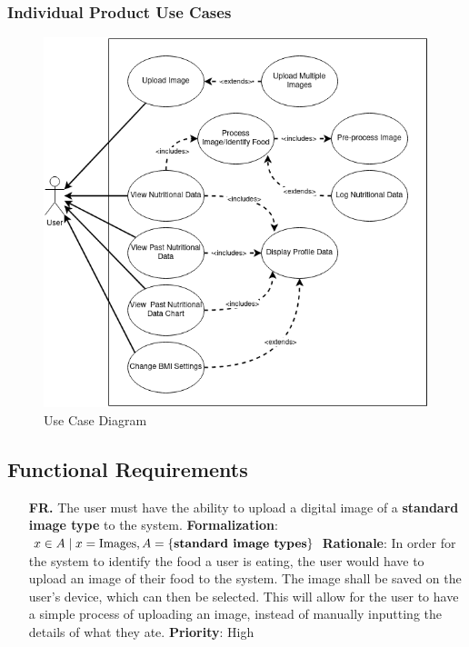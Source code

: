\documentclass[12pt]{article}
\newcounter{FRCounter}
\newcommand{\FillFRNumber}{\textbf{FR\arabic{FRCounter}.} \stepcounter{FRCounter}}
\begin{document}
\subsubsection{Individual Product Use Cases}
\begin{figure}[H]
	\centering
	\includegraphics[scale=0.7]{use_case_diagram.png}
	\caption{Use Case Diagram}
\end{figure}

\subsection{Functional Requirements}


\begin{itemize}
    \item [\FillFRNumber] The user must have the ability to upload a digital image of a \textbf{standard image type} to the system.\newline 
    \textbf{Formalization}: $x \in A \mid x = \text{Images}, A = \{\text{\textbf{standard image types}}\}$\newline
    \textbf{Rationale}: In order for the system to identify the food a user is eating, the user would have to upload an image of their food to the system. The image shall be saved on the user’s device, which can then be selected. This will allow for the user to have a simple process of uploading an image, instead of manually inputting the details of what they ate.\newline
    \textbf{Priority}: High
\end{itemize}
\end{document}
